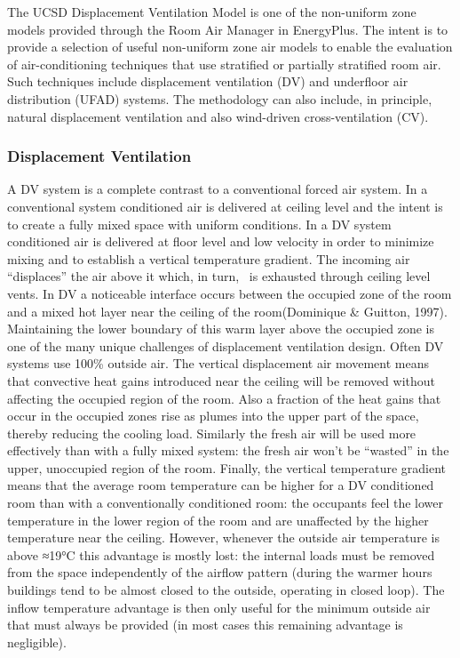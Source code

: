 The UCSD Displacement Ventilation Model is one of the non-uniform zone models provided through the Room Air Manager in EnergyPlus. The intent is to provide a selection of useful non-uniform zone air models to enable the evaluation of air-conditioning techniques that use stratified or partially stratified room air. Such techniques include displacement ventilation (DV) and underfloor air distribution (UFAD) systems. The methodology can also include, in principle, natural displacement ventilation and also wind-driven cross-ventilation (CV).

\subsubsection{Displacement Ventilation}\label{displacement-ventilation}

A DV system is a complete contrast to a conventional forced air system. In a conventional system conditioned air is delivered at ceiling level and the intent is to create a fully mixed space with uniform conditions. In a DV system conditioned air is delivered at floor level and low velocity in order to minimize mixing and to establish a vertical temperature gradient. The incoming air ``displaces'' the air above it which, in turn,~ is exhausted through ceiling level vents. In DV a noticeable interface occurs between the occupied zone of the room and a mixed hot layer near the ceiling of the room(Dominique \& Guitton, 1997). Maintaining the lower boundary of this warm layer above the occupied zone is one of the many unique challenges of displacement ventilation design. Often DV systems use 100\% outside air. The vertical displacement air movement means that convective heat gains introduced near the ceiling will be removed without affecting the occupied region of the room. Also a fraction of the heat gains that occur in the occupied zones rise as plumes into the upper part of the space, thereby reducing the cooling load. Similarly the fresh air will be used more effectively than with a fully mixed system: the fresh air won't be ``wasted'' in the upper, unoccupied region of the room. Finally, the vertical temperature gradient means that the average room temperature can be higher for a DV conditioned room than with a conventionally conditioned room: the occupants feel the lower temperature in the lower region of the room and are unaffected by the higher temperature near the ceiling. However, whenever the outside air temperature is above ≈19°C this advantage is mostly lost: the internal loads must be removed from the space independently of the airflow pattern (during the warmer hours buildings tend to be almost closed to the outside, operating in closed loop). The inflow temperature advantage is then only useful for the minimum outside air that must always be provided (in most cases this remaining advantage is negligible).

